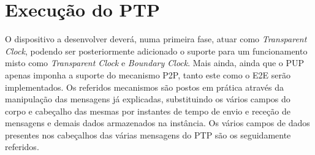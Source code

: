 
\chapter{Execução do PTP}
\label{chapter:conclusions}

O dispositivo a desenvolver deverá, numa primeira fase, atuar como \textit{Transparent Clock}, podendo ser posteriormente adicionado o suporte para um funcionamento misto como \textit{Transparent Clock} e \textit{Boundary Clock}. Mais ainda, ainda que o PUP apenas imponha a suporte do mecanismo P2P, tanto este como o E2E serão implementados. Os referidos mecanismos são postos em prática através da manipulação das mensagens já explicadas, substituindo os vários campos do corpo e cabeçalho das mesmas por instantes de tempo de envio e receção de mensagens e demais dados armazenados na instância. Os vários campos de dados presentes nos cabeçalhos das várias mensagens do PTP são os seguidamente referidos.  

